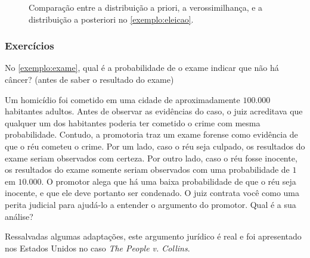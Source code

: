 \begin{example}
\begin{figure}
\begin{knitrout}
\end{knitrout}
 \caption{Comparação entre a distribuição a priori, a verossimilhança, e a distribuição a posteriori no \cref{exemplo:eleicao}.}
 \label{figura:eleicao}
\end{figure}

\end{example}

\subsubsection*{Exercícios}

\begin{exercise}
 No \cref{exemplo:exame}, qual é a 
 probabilidade de o exame indicar que não há câncer? 
 (antes de saber o resultado do exame)
\end{exercise}


\begin{exercise}
 Um homicídio foi cometido em uma cidade de
 aproximadamente $100.000$ habitantes adultos.
 Antes de observar as evidências do caso, 
 o juiz acreditava que qualquer um dos habitantes
 poderia ter cometido o crime com mesma probabilidade.
 Contudo, a promotoria traz um exame forense como
 evidência de que o réu cometeu o crime.
 Por um lado, caso o réu seja culpado, 
 os resultados do exame seriam 
 observados com certeza.
 Por outro lado, caso o réu fosse inocente, 
 os resultados do exame somente seriam 
 observados com uma probabilidade de 
 $1$ em $10.000$.
 O promotor alega que há
uma baixa probabilidade de que
o réu seja inocente, e que ele deve portanto ser condenado.
 O juiz contrata você como uma
 perita judicial para ajudá-lo a 
 entender o argumento do promotor.
 Qual é a sua análise?
 
 Ressalvadas algumas adaptações, 
 este argumento jurídico é real e
 foi apresentado nos Estados Unidos no
 caso \emph{The People v. Collins}.
\end{exercise}

